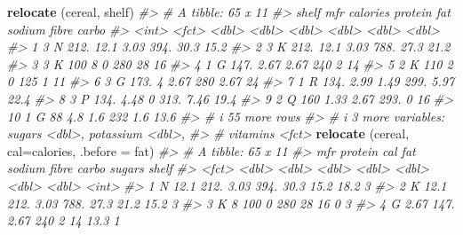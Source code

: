 \documentclass[
]{book}
\newenvironment{Shaded}{\begin{snugshade}}{\end{snugshade}}
\newcommand{\AttributeTok}[1]{\textcolor[rgb]{0.13,0.29,0.53}{#1}}
\newcommand{\CommentTok}[1]{\textcolor[rgb]{0.56,0.35,0.01}{\textit{#1}}}
\newcommand{\FunctionTok}[1]{\textcolor[rgb]{0.13,0.29,0.53}{\textbf{#1}}}
\newcommand{\NormalTok}[1]{#1}
\begin{document}
\begin{Shaded}
\begin{Highlighting}[]
\FunctionTok{relocate}\NormalTok{ (cereal, shelf)}
\CommentTok{\#\textgreater{} \# A tibble: 65 x 11}
\CommentTok{\#\textgreater{}    shelf mfr   calories protein   fat sodium fibre carbo}
\CommentTok{\#\textgreater{}    \textless{}int\textgreater{} \textless{}fct\textgreater{}    \textless{}dbl\textgreater{}   \textless{}dbl\textgreater{} \textless{}dbl\textgreater{}  \textless{}dbl\textgreater{} \textless{}dbl\textgreater{} \textless{}dbl\textgreater{}}
\CommentTok{\#\textgreater{}  1     3 N         212.   12.1   3.03   394. 30.3   15.2}
\CommentTok{\#\textgreater{}  2     3 K         212.   12.1   3.03   788. 27.3   21.2}
\CommentTok{\#\textgreater{}  3     3 K         100     8     0      280  28     16  }
\CommentTok{\#\textgreater{}  4     1 G         147.    2.67  2.67   240   2     14  }
\CommentTok{\#\textgreater{}  5     2 K         110     2     0      125   1     11  }
\CommentTok{\#\textgreater{}  6     3 G         173.    4     2.67   280   2.67  24  }
\CommentTok{\#\textgreater{}  7     1 R         134.    2.99  1.49   299.  5.97  22.4}
\CommentTok{\#\textgreater{}  8     3 P         134.    4.48  0      313.  7.46  19.4}
\CommentTok{\#\textgreater{}  9     2 Q         160     1.33  2.67   293.  0     16  }
\CommentTok{\#\textgreater{} 10     1 G          88     4.8   1.6    232   1.6   13.6}
\CommentTok{\#\textgreater{} \# i 55 more rows}
\CommentTok{\#\textgreater{} \# i 3 more variables: sugars \textless{}dbl\textgreater{}, potassium \textless{}dbl\textgreater{},}
\CommentTok{\#\textgreater{} \#   vitamins \textless{}fct\textgreater{}}
\FunctionTok{relocate}\NormalTok{ (cereal, }\AttributeTok{cal=}\NormalTok{calories, }\AttributeTok{.before =}\NormalTok{ fat)}
\CommentTok{\#\textgreater{} \# A tibble: 65 x 11}
\CommentTok{\#\textgreater{}    mfr   protein   cal   fat sodium fibre carbo sugars shelf}
\CommentTok{\#\textgreater{}    \textless{}fct\textgreater{}   \textless{}dbl\textgreater{} \textless{}dbl\textgreater{} \textless{}dbl\textgreater{}  \textless{}dbl\textgreater{} \textless{}dbl\textgreater{} \textless{}dbl\textgreater{}  \textless{}dbl\textgreater{} \textless{}int\textgreater{}}
\CommentTok{\#\textgreater{}  1 N       12.1   212.  3.03   394. 30.3   15.2  18.2      3}
\CommentTok{\#\textgreater{}  2 K       12.1   212.  3.03   788. 27.3   21.2  15.2      3}
\CommentTok{\#\textgreater{}  3 K        8     100   0      280  28     16     0        3}
\CommentTok{\#\textgreater{}  4 G        2.67  147.  2.67   240   2     14    13.3      1}

\end{Highlighting}
\end{Shaded}
\end{document}
